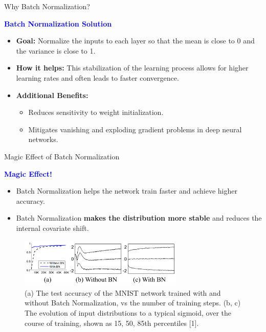 \documentclass[serif, aspectratio=169]{beamer}
\begin{document}
\begin{frame}{Why Batch Normalization?}

    \textcolor{blue}{\textbf{Batch Normalization Solution}}
    
    \begin{itemize}

    \item \textbf{Goal:} Normalize the inputs to each layer so that the mean is close to 0 and the variance is close to 1.
    \item \textbf{How it helps:} This stabilization of the learning process allows for higher learning rates and often leads to faster convergence.
    \item \textbf{Additional Benefits:}
        \begin{itemize}
        \item Reduces sensitivity to weight initialization.
        \item Mitigates vanishing and exploding gradient problems in deep neural networks.
        \end{itemize}


    \end{itemize}
\end{frame}

\begin{frame}{Magic Effect of Batch Normalization}

    \textcolor{blue}{\textbf{Magic Effect!}}
    
    \begin{itemize}
            \item Batch Normalization helps the network train faster and achieve higher accuracy.
            \item Batch Normalization \textbf{makes the distribution more stable} and reduces the internal covariate shift.
    \end{itemize}

        \begin{figure}
        \includegraphics[width=0.7\textwidth]{pic/BN.png}
        \caption{(a) The test accuracy of the MNIST network trained with and without Batch Normalization, vs the number of training steps. (b, c) The evolution of input distributions to a typical sigmoid, over the course of training, shown as {15, 50, 85}th percentiles [1].}
        \label{fig:BN_Effect}
    \end{figure}
\end{frame}
\end{document}
